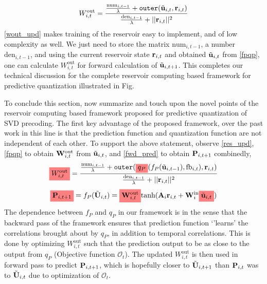 \documentclass[conference]{IEEEtran}
\newcommand{\highlight}[1]{%
  \colorbox{red!50}{$\displaystyle#1$}}
\begin{document}
\begin{equation}
W_{i,t}^{\text{out}}=\frac{\frac{\text{num}_{i,t-1}}{\lambda}+\texttt{outer}(\tilde{\bu}_{i,t},\br_{i,t})}{\frac{\text{den}_{i,t-1}}{\lambda}+||\br_{i,t}||^2}
\label{wout_upd}
\end{equation}
\eqref{wout_upd} makes training of the reservoir easy to implement, and of low complexity as well.
We just need to store the matrix $\text{num}_{i,t-1}$, a number $\text{den}_{i,t-1}$, and using the current reservoir state ${\bf r}_{i,t}$ and obtained $\tilde{{\bf u}}_{i,t}$ from \eqref{fpqp}, one can calculate $W_{i,t}^{\text{out}}$ for forward calculation of $\tilde{{\bf u}}_{i,t+1}$.
This completes our technical discussion for the complete reservoir computing based framework for predictive quantization illustrated in Fig. %

To conclude this section, now summarize and touch upon the novel points of the reservoir computing based framework proposed for predictive quantization of SVD precoding.
The first key advantage of the proposed framework, over the past work in this line \cite{Gupt1905:Predictive,6891198,6545375} is that the prediction function and quantization function are not independent of each other.
To support the above statement, observe \eqref{res_upd},\eqref{fpqp} to obtain ${\bf W}^{\text{out}}_{i,t}$ from $\tilde{{\bf u}}_{i,t}$, and \eqref{fwd_pred} to obtain ${\bf P}_{i,t+1}$ combinedly,
\begin{equation*}
\highlight{W_{i,t}^{\text{out}}}=\frac{\frac{\text{num}_{i,t-1}}{\lambda}+\texttt{outer}(\highlight{q_P}(f_P(\tilde{\bu}_{i,t-1}),\text{fb}_{i,t}),\br_{i,t})}{\frac{\text{den}_{i,t-1}}{\lambda}+||\br_{i,t}||^2}
\end{equation*}
\begin{equation*}
\highlight{\bP_{i,t+1}}=f_P(\tilde{\bU}_{i,t})=\highlight{\bW^{\text{out}}_{i,t}}\text{tanh}(\bA_i\br_{i,t}+\bW^{\text{in}}_i\highlight{\tilde{\bu}_{i,t}})
\end{equation*}
The dependence between $f_P$ and $q_P$ in our framework is in the sense that the backward pass of the framework ensures that prediction function `'learns' the correlations brought about by $q_P$, in addition to temporal correlations. %
This is done by optimizing $W_{i,t}^{\text{out}}$ such that the prediction output to be as close to the output from $q_P$ (Objective function $\mathcal{O}_t$).
The updated $W_{i,t}^{\text{out}}$ is then used in forward pass to predict ${\bf P}_{i,t+1}$, which is hopefully closer to $\tilde{{\bf U}}_{i,t+1}$ than ${\bf P}_{i,t}$ was to $\tilde{{\bf U}}_{i,t}$ due to optimization of $\mathcal{O}_t$.
\end{document}
